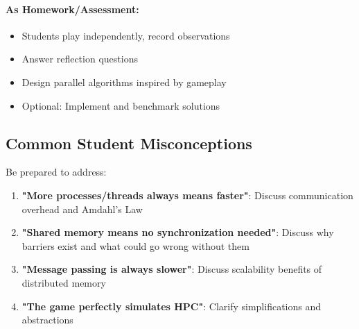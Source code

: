 \paragraph{As Homework/Assessment:}
\begin{itemize}
    \item Students play independently, record observations
    \item Answer reflection questions
    \item Design parallel algorithms inspired by gameplay
    \item Optional: Implement and benchmark solutions
\end{itemize}

\subsection{Common Student Misconceptions}

Be prepared to address:

\begin{enumerate}
    \item \textbf{"More processes/threads always means faster"}: Discuss communication overhead and Amdahl's Law
    \item \textbf{"Shared memory means no synchronization needed"}: Discuss why barriers exist and what could go wrong without them
    \item \textbf{"Message passing is always slower"}: Discuss scalability benefits of distributed memory
    \item \textbf{"The game perfectly simulates HPC"}: Clarify simplifications and abstractions
\end{enumerate}

